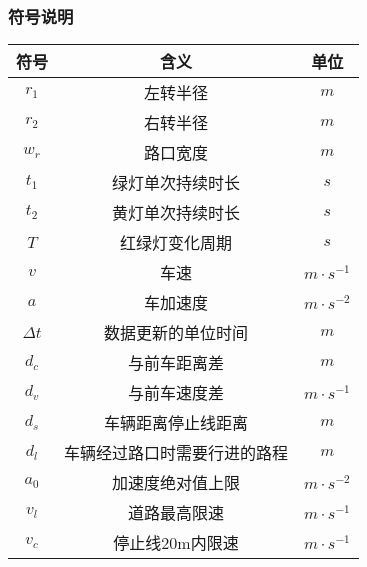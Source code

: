 \documentclass[a4paper,12pt]{article}
\numberwithin{equation}{section}
\begin{document}
	\subsubsection{符号说明}
	\setlength\LTleft{0pt}
	\setlength{\tabcolsep}{25pt}
	\begin{longtable}{ccc}
		\\\hline
\textbf{符号}&\textbf{含义}&\textbf{单位}\\
		\hline
		$r_1$&左转半径&$m$\\\hline
		$r_2$&右转半径&$m$\\\hline
		$w_r$&路口宽度&$m$\\\hline
		$t_1$&绿灯单次持续时长&$s$\\\hline
		$t_2$&黄灯单次持续时长&$s$\\\hline
		$T$&红绿灯变化周期&$s$\\\hline
		$v$&车速&$m\cdot s^{-1}$\\\hline
		$a$&车加速度&$m\cdot s^{-2}$\\\hline
		$\Delta t$&数据更新的单位时间&$m$\\\hline
		$d_c$&与前车距离差&$m$\\\hline
		$d_v$&与前车速度差&$m\cdot s^{-1}$\\\hline
		$d_s$&车辆距离停止线距离&$m$\\\hline
		$d_l$&车辆经过路口时需要行进的路程&$m$\\\hline
		$a_0$&加速度绝对值上限&$m\cdot s^{-2}$\\\hline
		$v_l$&道路最高限速&$m\cdot s^{-1}$\\\hline
		$v_c$&停止线20m内限速&$m\cdot s^{-1}$\\\hline
	\end{longtable}
\end{document}
